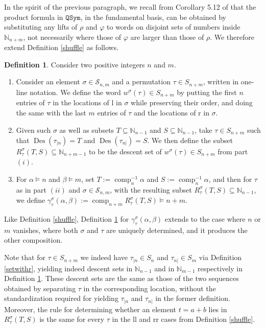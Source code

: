 \documentclass{article}
\theoremstyle{definition}
\newtheorem{defn}[thm]{Definition}
\begin{document}
In the spirit of the previous paragraph, we recall from Corollary 5.12 of \cite{[AsS]} that the product formula in $\mathtt{QSym}$, in the fundamental basis, can be obtained by substituting any lifts of $\rho$ and $\varphi$ to words on disjoint sets of numbers inside $\mathbb{N}_{n+m}$, not necessarily where those of $\varphi$ are larger than those of $\rho$. We therefore extend Definition \ref{shuffle} as follows.
\begin{defn}
Consider two positive integers $n$ and $m$.
\begin{enumerate}[$(i)$]
\item Consider an element $\sigma\in\mathcal{S}_{n,m}$ and a permutation $\tau \in S_{n+m}$, written in one-line notation. We define the word $w^{\sigma}(\tau) \in S_{n+m}$ by putting the first $n$ entries of $\tau$ in the locations of l in $\sigma$ while preserving their order, and doing the same with the last $m$ entries of $\tau$ and the locations of r in $\sigma$.
\item Given such $\sigma$ as well as subsets $T\subseteq\mathbb{N}_{n-1}$ and $S\subseteq\mathbb{N}_{n-1}$, take $\tau \in S_{n+m}$ such that $\operatorname{Des}(\tau_{|n})=T$ and $\operatorname{Des}(\tau_{n|})=S$. We then define the subset $R^{\sigma}_{\tau}(T,S)\subseteq\mathbb{N}_{n+m-1}$ to be the descent set of $w^{\sigma}(\tau) \in S_{n+m}$ from part $(i)$.
\item For $\alpha \vDash n$ and $\beta \vDash m$, set $T:=\operatorname{comp}_{n}^{-1}\alpha$ and $S:=\operatorname{comp}_{n}^{-1}\alpha$, and then for $\tau$ as in part $(ii)$ and $\sigma\in\mathcal{S}_{n,m}$, with the resulting subset $R^{\sigma}_{\tau}(T,S)\subseteq\mathbb{N}_{n-1}$, we define $\gamma^{\sigma}_{\tau}(\alpha,\beta):=\operatorname{comp}_{n+m}R^{\sigma}_{\tau}(T,S) \vDash n+m$.
\end{enumerate} \label{altshuff}
\end{defn}
Like Definition \ref{shuffle}, Definition \ref{altshuff} for $\gamma^{\sigma}_{\tau}(\alpha,\beta)$ extends to the case where $n$ or $m$ vanishes, where both $\sigma$ and $\tau$ are uniquely determined, and it produces the other composition.

Note that for $\tau \in S_{n+m}$ we indeed have $\tau_{|n} \in S_{n}$ and $\tau_{n|} \in S_{m}$ via Definition \ref{setwithr}, yielding indeed descent sets in $\mathbb{N}_{n-1}$ and in $\mathbb{N}_{m-1}$ respectively in Definition \ref{altshuff}. These descent sets are the same as those of the two sequences obtained by separating $\tau$ in the corresponding location, without the standardization required for yielding $\tau_{|n}$ and $\tau_{n|}$ in the former definition. Moreover, the rule for determining whether an element $t=a+b$ lies in $R^{\sigma}_{\tau}(T,S)$ is the same for every $\tau$ in the ll and rr cases from Definition \ref{shuffle}.
\end{document}
